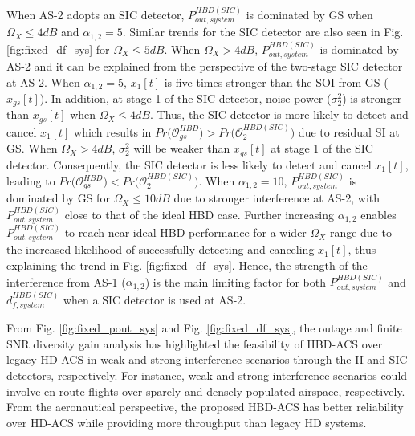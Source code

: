 When AS-2 adopts an SIC detector, $P_{out,system}^{HBD(SIC)}$ is dominated by GS when $\Omega_X\leq4dB$ and $\alpha_{1,2}=5$. Similar trends for the SIC detector are also seen in Fig. \ref{fig:fixed_df_sys} for $\Omega_X \leq 5dB$. When $\Omega_X>4dB$, $P_{out,system}^{HBD(SIC)}$ is dominated by AS-2 and it can be explained from the perspective of the two-stage SIC detector at AS-2. When $\alpha_{1,2}=5$, $x_1[t]$ is five times stronger than the SOI from GS ($x_{gs}[t]$). In addition, at stage 1 of the SIC detector, noise power ($\sigma^2_{2}$) is stronger than $x_{gs}[t]$ when $\Omega_X\leq4dB$. Thus, the SIC detector is more likely to detect and cancel $x_1[t]$ which results in $Pr\big(\mathcal{O}_{gs}^{HBD}\big)>Pr\big(\mathcal{O}_{2}^{HBD(SIC)}\big)$ due to residual SI at GS. When $\Omega_X>4dB$, $\sigma_2^2$ will be weaker than $x_{gs}[t]$ at stage 1 of the SIC detector. Consequently, the SIC detector is less likely to detect and cancel $x_1[t]$, leading to $Pr\big(\mathcal{O}_{gs}^{HBD}\big)<Pr\big(\mathcal{O}_{2}^{HBD(SIC)}\big)$. When $\alpha_{1,2}=10$, $P_{out,system}^{HBD(SIC)}$ is dominated by GS for $\Omega_X \leq 10dB$ due to stronger interference at AS-2, with $P_{out,system}^{HBD(SIC)}$ close to that of the ideal HBD case. Further increasing $\alpha_{1,2}$ enables $P_{out,system}^{HBD(SIC)}$ to reach near-ideal HBD performance for a wider $\Omega_X$ range due to the increased likelihood of successfully detecting and canceling $x_1[t]$, thus explaining the trend in Fig. \ref{fig:fixed_df_sys}. Hence, the strength of the interference from AS-1 ($\alpha_{1,2}$) is the main limiting factor for both $P_{out,system}^{HBD(SIC)}$ and $d_{f,system}^{HBD(SIC)}$ when a SIC detector is used at AS-2. 


From Fig. \ref{fig:fixed_pout_sys} and Fig. \ref{fig:fixed_df_sys}, the outage and finite SNR diversity gain analysis has highlighted the feasibility of HBD-ACS over legacy HD-ACS in weak and strong interference scenarios through the II and SIC detectors, respectively. For instance, weak and strong interference scenarios could involve en route flights over sparely and densely populated airspace, respectively. From the aeronautical perspective, the proposed HBD-ACS has better reliability over HD-ACS while providing more throughput than legacy HD systems. 

